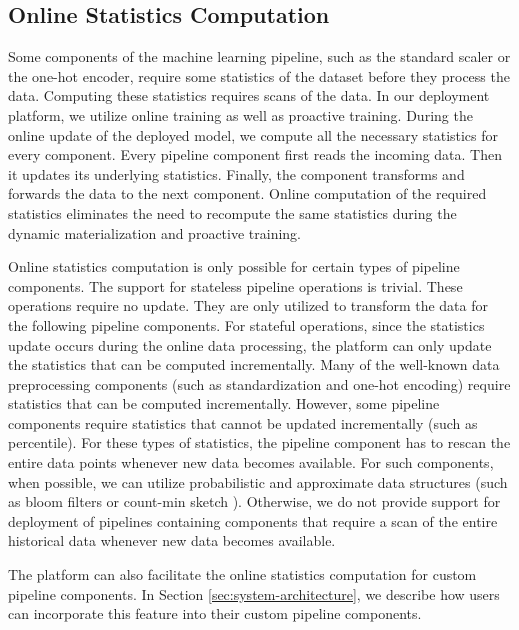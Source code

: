 \subsection{Online Statistics Computation}\label{online-statistics-computation}
Some components of the machine learning pipeline, such as the standard scaler or the one-hot encoder, require some statistics of the dataset before they process the data.
Computing these statistics requires scans of the data.
In our deployment platform, we utilize online training as well as proactive training.
During the online update of the deployed model, we compute all the necessary statistics for every component.
Every pipeline component first reads the incoming data.
Then it updates its underlying statistics.
Finally, the component transforms and forwards the data to the next component.
Online computation of the required statistics eliminates the need to recompute the same statistics during the dynamic materialization and proactive training.

Online statistics computation is only possible for certain types of pipeline components.
The support for stateless pipeline operations is trivial.
These operations require no update.
They are only utilized to transform the data for the following pipeline components.
For stateful operations, since the statistics update occurs during the online data processing, the platform can only update the statistics that can be computed incrementally.
Many of the well-known data preprocessing components (such as standardization and one-hot encoding) require statistics that can be computed incrementally.
However, some pipeline components require statistics that cannot be updated incrementally (such as percentile).
For these types of statistics, the pipeline component has to rescan the entire data points whenever new data becomes available.
For such components, when possible, we can utilize probabilistic and approximate data structures (such as bloom filters or count-min sketch \cite{cormode2005improved}).
Otherwise, we do not provide support for deployment of pipelines containing components that require a scan of the entire historical data whenever new data becomes available.

The platform can also facilitate the online statistics computation for custom pipeline components.
In Section \ref{sec:system-architecture}, we describe how users can incorporate this feature into their custom pipeline components.


